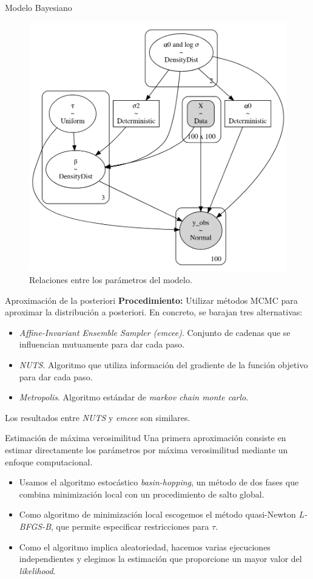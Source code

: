 \documentclass[10pt, spanish, professionalfonts]{beamer}
\begin{document}
\begin{frame}{Modelo Bayesiano}
  \begin{figure}
    \includegraphics[width=.6\textwidth]{img/modelo_lin}
    \caption{Relaciones entre los parámetros del modelo.}
  \end{figure}
\end{frame}

\begin{frame}{Aproximación de la posteriori}
  \textbf{Procedimiento:} Utilizar métodos MCMC para aproximar la distribución a posteriori. En concreto, se barajan tres alternativas:
  \begin{itemize}
    \item {\color{Maroon}\textit{Affine-Invariant Ensemble Sampler (emcee)}}. Conjunto de cadenas que se influencian mutuamente para dar cada paso.
    \item \textit{NUTS}. Algoritmo que utiliza información del gradiente de la función objetivo para dar cada paso.
    \item \textit{Metropolis}. Algoritmo estándar de \textit{markov chain monte carlo}.
  \end{itemize}

  \vspace{1em}

  Los resultados entre \textit{NUTS} y \textit{emcee} son similares.
\end{frame}

\begin{frame}{Estimación de máxima verosimilitud}
  Una primera aproximación consiste en estimar directamente los parámetros por máxima verosimilitud mediante un enfoque computacional.
  \begin{itemize}
    \item Usamos el algoritmo estocástico \textit{basin-hopping}, un método de dos fases que combina minimización local con un procedimiento de salto global.
    \item Como algoritmo de minimización local escogemos el método quasi-Newton \textit{L-BFGS-B}, que permite especificar restricciones para \(\tau\).
    \item Como el algoritmo implica aleatoriedad, hacemos varias ejecuciones independientes y elegimos la estimación que proporcione un mayor valor del \textit{likelihood}.
  \end{itemize}
\end{frame}
\end{document}
